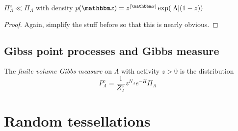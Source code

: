 \begin{proposition} $\Pi_\Lambda^z \ll \Pi_\Lambda$ with density $p(\x)=z^{|\x|} \exp(|\Lambda|(1-z))$
\end{proposition}
\begin{proof}
Again, simplify the stuff before so that this is nearly obvious.
\end{proof}


\subsection{Gibss point processes and Gibbs measure}

\begin{definition}
The \textit{finite volume Gibbs measure} on $\Lambda$ with activity $z>0$ is the distribution
$$P^{z}_\Lambda = \frac 1{Z^{z}_\Lambda} z^{N_\Lambda} e^{-H} \Pi_\Lambda$$
\end{definition}



\section{Random tessellations}
